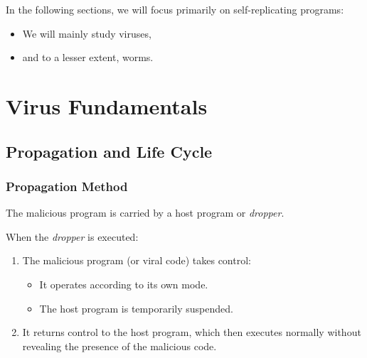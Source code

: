 \documentclass{beamer}
\newcommand{\enlight}[1]{\textit{\color{blue}#1}}
\begin{document}
\begin{frame}
In the following sections, we will focus primarily on self-replicating programs:
\begin{itemize}
\item We will mainly study viruses,
\item and to a lesser extent, worms.
\end{itemize}
\end{frame}

\section{Virus Fundamentals}

\subsection{Propagation and Life Cycle}

\begin{frame}
\frametitle{Propagation Method}
  The malicious program is carried by a host program or \enlight{dropper}.
  \bigskip

  {\color{blue} When the \enlight{dropper} is executed:}
\begin{enumerate}
\item The malicious program (or viral code) takes control:
  \begin{itemize}
  \item It operates according to its own mode.
  \item The host program is temporarily suspended.
  \end{itemize}
  \medskip

\item It returns control to the host program, which then executes normally without revealing the presence of the malicious code.
\end{enumerate}

\end{frame}
\end{document}
